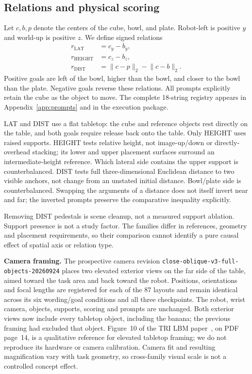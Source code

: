 \documentclass[11pt]{article}
\begin{document}
\subsection{Relations and physical scoring}
Let $c,b,p$ denote the centers of the cube, bowl, and plate. Robot-left is positive $y$ and world-up is positive $z$. We define signed relations
\begin{align}
r_{\mathrm{LAT}} &= c_y-b_y,\\
r_{\mathrm{HEIGHT}} &= c_z-b_z,\\
r_{\mathrm{DIST}} &= \lVert c-p\rVert_2-\lVert c-b\rVert_2.
\end{align}
Positive goals are left of the bowl, higher than the bowl, and closer to the bowl than the plate. Negative goals reverse these relations. All prompts explicitly retain the cube as the object to move. The complete 18-string registry appears in Appendix~\ref{app:prompts} and in the execution package.

LAT and DIST use a flat tabletop: the cube and reference objects rest directly on the table, and both goals require release back onto the table. Only HEIGHT uses raised supports. HEIGHT tests relative height, not image-up/down or directly-overhead stacking; its lower and upper placement surfaces surround an intermediate-height reference. Which lateral side contains the upper support is counterbalanced. DIST tests full three-dimensional Euclidean distance to two visible anchors, not change from an unstated initial distance. Bowl/plate side is counterbalanced. Swapping the arguments of a distance does not itself invert near and far; the inverted prompts preserve the comparative inequality explicitly.

Removing DIST pedestals is scene cleanup, not a measured support ablation. Support presence is not a study factor. The families differ in references, geometry and placement requirements, so their comparison cannot identify a pure causal effect of spatial axis or relation type.

\textbf{Camera framing.} The prospective camera revision \texttt{close-oblique-v3-full-objects-20260924} places two elevated exterior views on the far side of the table, aimed toward the task area and back toward the robot. Positions, orientations and focal lengths are registered for each of the 87 layouts and remain identical across its six wording/goal conditions and all three checkpoints. The robot, wrist camera, objects, supports, scoring and prompts are unchanged. Both exterior views now include every tabletop object, including the banana; the previous framing had excluded that object. Figure~10 of the TRI LBM paper~\cite{trilbm}, on PDF page~14, is a qualitative reference for elevated tabletop framing; we do not reproduce its hardware or camera calibration. Camera fit and resulting magnification vary with task geometry, so cross-family visual scale is not a controlled concept effect.
\end{document}
